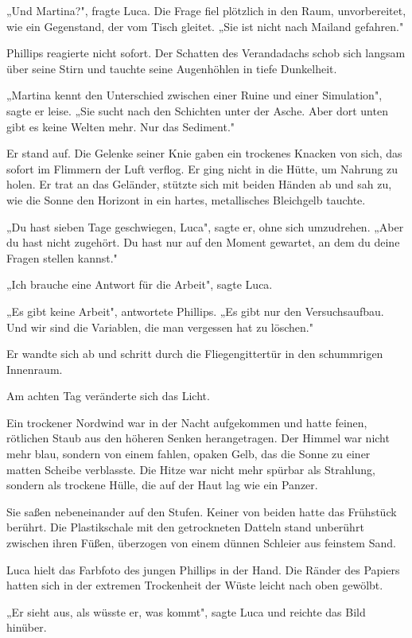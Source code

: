 \documentclass[
  ngerman,
]{article}
\begin{document}
„Und Martina?", fragte Luca. Die Frage fiel plötzlich in den Raum,
unvorbereitet, wie ein Gegenstand, der vom Tisch gleitet. „Sie ist nicht
nach Mailand gefahren."

Phillips reagierte nicht sofort. Der Schatten des Verandadachs schob
sich langsam über seine Stirn und tauchte seine Augenhöhlen in tiefe
Dunkelheit.

„Martina kennt den Unterschied zwischen einer Ruine und einer
Simulation", sagte er leise. „Sie sucht nach den Schichten unter der
Asche. Aber dort unten gibt es keine Welten mehr. Nur das Sediment."

Er stand auf. Die Gelenke seiner Knie gaben ein trockenes Knacken von
sich, das sofort im Flimmern der Luft verflog. Er ging nicht in die
Hütte, um Nahrung zu holen. Er trat an das Geländer, stützte sich mit
beiden Händen ab und sah zu, wie die Sonne den Horizont in ein hartes,
metallisches Bleichgelb tauchte.

„Du hast sieben Tage geschwiegen, Luca", sagte er, ohne sich umzudrehen.
„Aber du hast nicht zugehört. Du hast nur auf den Moment gewartet, an
dem du deine Fragen stellen kannst."

„Ich brauche eine Antwort für die Arbeit", sagte Luca.

„Es gibt keine Arbeit", antwortete Phillips. „Es gibt nur den
Versuchsaufbau. Und wir sind die Variablen, die man vergessen hat zu
löschen."

Er wandte sich ab und schritt durch die Fliegengittertür in den
schummrigen Innenraum.

Am achten Tag veränderte sich das Licht.

Ein trockener Nordwind war in der Nacht aufgekommen und hatte feinen,
rötlichen Staub aus den höheren Senken herangetragen. Der Himmel war
nicht mehr blau, sondern von einem fahlen, opaken Gelb, das die Sonne zu
einer matten Scheibe verblasste. Die Hitze war nicht mehr spürbar als
Strahlung, sondern als trockene Hülle, die auf der Haut lag wie ein
Panzer.

Sie saßen nebeneinander auf den Stufen. Keiner von beiden hatte das
Frühstück berührt. Die Plastikschale mit den getrockneten Datteln stand
unberührt zwischen ihren Füßen, überzogen von einem dünnen Schleier aus
feinstem Sand.

Luca hielt das Farbfoto des jungen Phillips in der Hand. Die Ränder des
Papiers hatten sich in der extremen Trockenheit der Wüste leicht nach
oben gewölbt.

„Er sieht aus, als wüsste er, was kommt", sagte Luca und reichte das
Bild hinüber.
\end{document}
